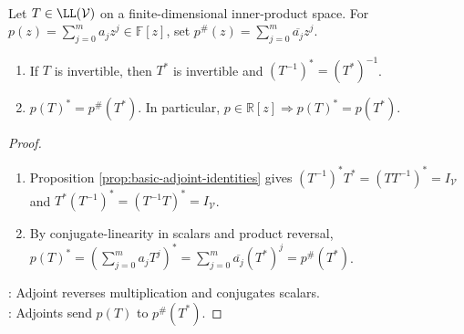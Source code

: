 \begin{proposition} \label{prop:adjoints-inverses-and-polynomials} \\
Let $T\in\LL(\mathcal{V})$ on a finite-dimensional inner-product space. For $p(z)=\sum\limits_{j=0}^{m}a_jz^j\in\mathbb{F}[z]$, set $p^{\#}(z)=\sum\limits_{j=0}^{m}\overline{a_j}z^j$.
\begin{enumerate}[label=(\roman*)]
\setlength{\itemsep}{0pt}
\item If $T$ is invertible, then $T^*$ is invertible and $(T^{-1})^*=(T^*)^{-1}$.
\item $p(T)^*=p^{\#}(T^*)$. In particular, $p\in\mathbb{R}[z]\Rightarrow p(T)^*=p(T^*)$.
\end{enumerate}
\begin{proof}
\begin{enumerate}[label=(\roman*)]
\setlength{\itemsep}{0pt}
\item Proposition \ref{prop:basic-adjoint-identities} gives $(T^{-1})^*T^*=(TT^{-1})^*=I_{\mathcal{V}}$ and $T^*(T^{-1})^*=(T^{-1}T)^*=I_{\mathcal{V}}$.
\item By conjugate-linearity in scalars and product reversal, $p(T)^*=\left(\sum\limits_{j=0}^{m}a_jT^j\right)^* =\sum\limits_{j=0}^{m}\overline{a_j}(T^*)^j =p^{\#}(T^*)$.
\end{enumerate}
: Adjoint reverses multiplication and conjugates scalars.\\
: Adjoints send $p(T)$ to $p^{\#}(T^*)$.
\end{proof}
\end{proposition}

